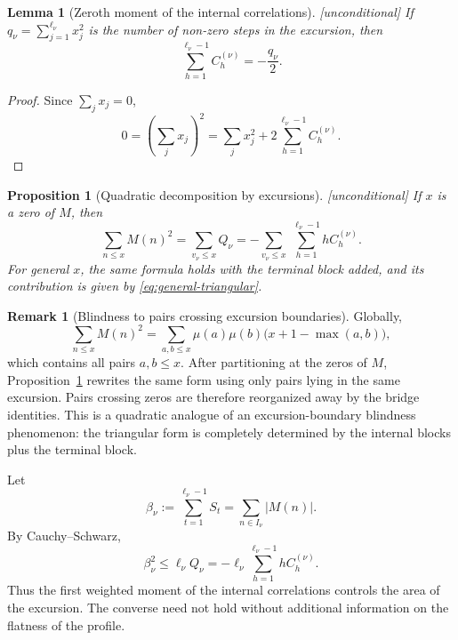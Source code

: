 \documentclass[11pt,reqno]{amsart}
\theoremstyle{plain}
\newtheorem{proposition}[theorem]{Proposition}
\newtheorem{lemma}[theorem]{Lemma}
\theoremstyle{definition}
\newtheorem{remark}[theorem]{Remark}
\begin{document}
\begin{lemma}[Zeroth moment of the internal correlations]
\label{lem:zeroth-corr}
\emph{[unconditional]} If
$q_\nu=\sum_{j=1}^{\ell_\nu}x_j^2$ is the number of non-zero steps in the
excursion, then
\begin{equation}
\label{eq:zeroth-corr}
  \sum_{h=1}^{\ell_\nu-1}C_h^{(\nu)}=-\frac{q_\nu}{2}.
\end{equation}
\end{lemma}

\begin{proof}
Since $\sum_jx_j=0$,
\[
  0=\left(\sum_jx_j\right)^2
   =\sum_jx_j^2+2\sum_{h=1}^{\ell_\nu-1}C_h^{(\nu)}.
\]
\end{proof}

\begin{proposition}[Quadratic decomposition by excursions]
\label{prop:quadratic-decomp}
\emph{[unconditional]} If $x$ is a zero of $M$, then
\begin{equation}
\label{eq:quadratic-decomp-zero}
  \sum_{n\le x}M(n)^2
   =\sum_{v_\nu\le x}Q_\nu
   =-\sum_{v_\nu\le x}\ \sum_{h=1}^{\ell_\nu-1}hC_h^{(\nu)}.
\end{equation}
For general $x$, the same formula holds with the terminal block added, and
its contribution is given by \eqref{eq:general-triangular}.
\end{proposition}

\begin{remark}[Blindness to pairs crossing excursion boundaries]
\label{rem:blindness-quadratic}
Globally,
\[
  \sum_{n\le x}M(n)^2
  =\sum_{a,b\le x}\mu(a)\mu(b)\bigl(x+1-\max(a,b)\bigr),
\]
which contains all pairs $a,b\le x$.  After partitioning at the zeros of
$M$, Proposition~\ref{prop:quadratic-decomp} rewrites the same form using
only pairs lying in the same excursion.  Pairs crossing zeros are therefore
reorganized away by the bridge identities.  This is a quadratic analogue
of an excursion-boundary blindness phenomenon: the triangular form is
completely determined by the internal blocks plus the terminal block.
\end{remark}

Let
\[
  \beta_\nu:=\sum_{t=1}^{\ell_\nu-1}S_t
             =\sum_{n\in I_\nu}|M(n)|.
\]
By Cauchy--Schwarz,
\begin{equation}
\label{eq:beta-Q}
  \beta_\nu^2\le \ell_\nu Q_\nu
  =-\ell_\nu\sum_{h=1}^{\ell_\nu-1}hC_h^{(\nu)}.
\end{equation}
Thus the first weighted moment of the internal correlations controls the
area of the excursion.  The converse need not hold without additional
information on the flatness of the profile.
\end{document}
